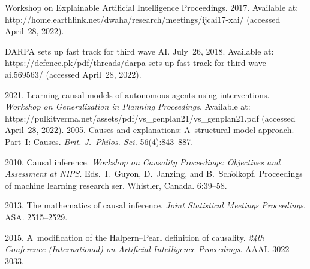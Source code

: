 




  \begin{multicols}{2}

\renewcommand{\bibname}{\protect\rmfamily References}

{\small\frenchspacing
 {%
 \begin{thebibliography}{99}
 
Workshop on Explainable Artificial Intelligence Proceedings. 2017. Available at: {\sf  
http://home.earthlink.net/\linebreak dwaha/research/meetings/ijcai17-xai/} (accessed April~28, 2022).

DARPA sets up fast track for third wave AI. July~26, 2018. Available at: {\sf 
https://defence.pk/pdf/threads/darpa-sets-up-fast-track-for-third-wave-ai.569563/} (accessed April~28, 
2022).

 2021. Learning causal models of autonomous agents using 
interventions. \textit{Workshop on Generalization in Planning Proceedings}. Available at: {\sf 
https://pulkitverma.net/assets/pdf/vs\_genplan21/vs\_\linebreak genplan21.pdf} (accessed April~28, 2022).
 2005. Causes and explanations: A~structural-model approach. 
Part~I: Causes. \textit{Brit. J.~Philos. Sci.} 56(4):843--887.

 2010. Causal inference. \textit{Workshop on Causality  Proceedings: Objectives and Assessment at NIPS}. 
Eds.\ I.~Guyon, D.~Janzing, and B.~Sch$\ddot{\mbox{o}}$lkopf. 
Proceedings of machine learning research ser. Whistler, Canada. 6:39--58. 

 2013. The mathematics of causal inference. \textit{Joint Statistical Meetings 
Proceedings}. ASA. 2515--2529.

 2015. A~modification of the Halpern--Pearl definition of causality. \textit{24th 
Conference (International) on Artificial Intelligence Proceedings}. AAAI. 3022--3033. 



\end{thebibliography}}}
\end{multicols}
